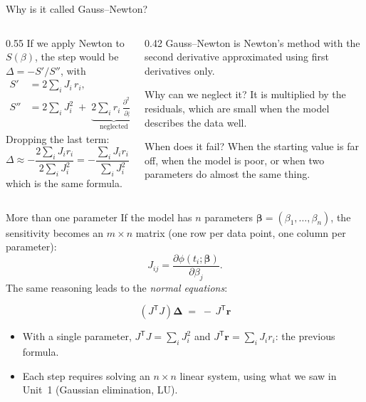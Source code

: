 \documentclass[aspectratio=169,10pt]{beamer}
\begin{document}
\begin{frame}{Why is it called Gauss--Newton?}
  \begin{columns}[T]
    \begin{column}{0.55\textwidth}
      If we apply Newton to $S(\beta)$, the step would be $\Delta = -S'/S''$, with
      \begin{align*}
        S'  &= 2\sum_i J_i\, r_i, \\
        S'' &= 2\sum_i J_i^2 \;+\; \underbrace{2\sum_i r_i\,\frac{\partial^2 \phi_i}{\partial \beta^2}}_{\text{neglected}} .
      \end{align*}
      Dropping the last term:
      \[
        \Delta \approx -\frac{2\sum_i J_i r_i}{2\sum_i J_i^2} = -\frac{\sum_i J_i r_i}{\sum_i J_i^2},
      \]
      which is the same formula.
    \end{column}
    \begin{column}{0.42\textwidth}
      Gauss--Newton is Newton's method with the second derivative approximated using first derivatives only.
      \medskip

      \begin{block}{Why can we neglect it?}
        It is multiplied by the residuals, which are small when the model describes the data well.
      \end{block}
      \begin{block}{When does it fail?}
        When the starting value is far off, when the model is poor, or when two parameters do almost the same thing.
      \end{block}
    \end{column}
  \end{columns}
\end{frame}

\begin{frame}{More than one parameter}
  If the model has $n$ parameters $\boldsymbol\beta = (\beta_1,\dots,\beta_n)$, the sensitivity becomes an $m\times n$ matrix (one row per data point, one column per parameter):
  \[ J_{ij} = \frac{\partial \phi(t_i;\boldsymbol\beta)}{\partial \beta_j} . \]
  The same reasoning leads to the \emph{normal equations}:
  \begin{ecuacion}
    \[ \left(J^{\mathsf T} J\right)\boldsymbol\Delta \;=\; -\,J^{\mathsf T}\mathbf r \]
  \end{ecuacion}
  \begin{itemize}
    \item With a single parameter, $J^{\mathsf T}J = \sum_i J_i^2$ and $J^{\mathsf T}\mathbf r = \sum_i J_i r_i$: the previous formula.
    \item Each step requires solving an $n\times n$ linear system, using what we saw in Unit~1 (Gaussian elimination, LU).
  \end{itemize}
\end{frame}
\end{document}
